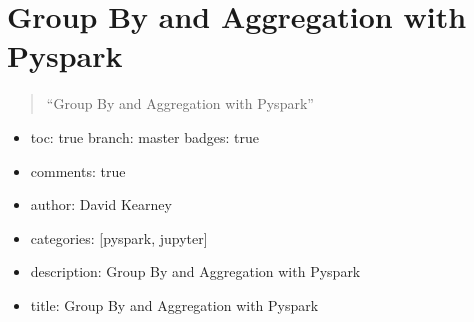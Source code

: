 \documentclass[letterpaper,10pt,english]{sphinxmanual}
\begin{document}
\begin{sphinxVerbatim}[commandchars=\\\{\}]
\PYG{p}{[}\PYG{p}{]}
\end{sphinxVerbatim}

\begin{sphinxVerbatim}[commandchars=\\\{\}]
\PYG{p}{[}\PYG{p}{]}\PYG{p}{[}\PYG{p}{]}\PYG{p}{[}\PYG{p}{]}\PYG{p}{[}\PYG{p}{]}
\end{sphinxVerbatim}


\chapter{Group By and Aggregation with Pyspark}
\label{\detokenize{2020-08-17-Pyspark-Group-By:group-by-and-aggregation-with-pyspark}}\label{\detokenize{2020-08-17-Pyspark-Group-By::doc}}\begin{quote}

“Group By and Aggregation with Pyspark”
\end{quote}
\begin{itemize}
\item {} 
toc: true\sphinxhyphen{} branch: master\sphinxhyphen{} badges: true

\item {} 
comments: true

\item {} 
author: David Kearney

\item {} 
categories: {[}pyspark, jupyter{]}

\item {} 
description: Group By and Aggregation with Pyspark

\item {} 
title: Group By and Aggregation with Pyspark

\end{itemize}
\end{document}
